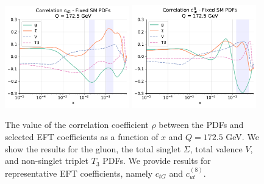 \documentclass[withindex,glossary]{cam-thesis}
\begin{document}
\begin{figure}[hbt!]
\centering
        \includegraphics[width=0.48\textwidth]{smeft_plots/correlations_fixed_fitpdf_plot_bsm_pdf_corr_OtG.pdf}
        \includegraphics[width=0.48\textwidth]{smeft_plots/correlations_fixed_fitpdf_plot_bsm_pdf_corr_O8ut.pdf}
	\caption{The value of the correlation coefficient $\rho$
          between the PDFs and selected EFT coefficients as a function of $x$
          and $Q=172.5$ GeV.
          We show the results for the gluon, the total singlet $\Sigma$, total valence $V$, and non-singlet
          triplet $T_3$ PDFs.
          We provide results for representative EFT coefficients, namely $c_{tG}$ and  $c_{ut}^{(8)}$.
        }
\label{fig:pdfbsmcorr}
\end{figure}
\end{document}

